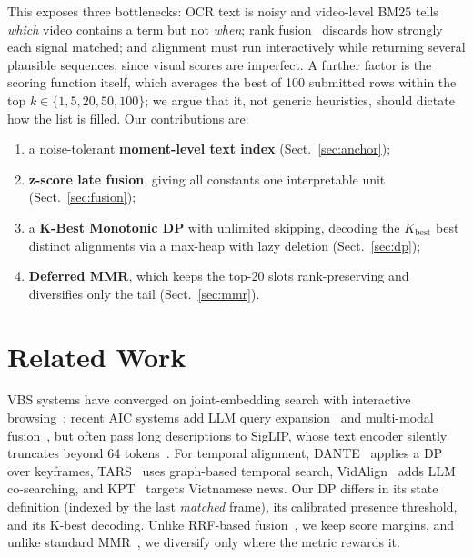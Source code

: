 \documentclass[runningheads]{llncs}
\newcommand{\Kb}{K_{\mathrm{best}}}
\begin{document}
This exposes three bottlenecks: OCR text is noisy and video-level BM25 tells \emph{which} video contains a term but not \emph{when}; rank fusion~\cite{cormack2009rrf,samuel2025mmmorrf} discards how strongly each signal matched; and alignment must run interactively while returning several plausible sequences, since visual scores are imperfect. A further factor is the scoring function itself, which averages the best of 100 submitted rows within the top $k\in\{1,5,20,50,100\}$; we argue that it, not generic heuristics, should dictate how the list is filled. Our contributions are:
\begin{enumerate}
\item a noise-tolerant \textbf{moment-level text index} (Sect.~\ref{sec:anchor});
\item \textbf{z-score late fusion}, giving all constants one interpretable unit (Sect.~\ref{sec:fusion});
\item a \textbf{K-Best Monotonic DP} with unlimited skipping, decoding the $\Kb$ best distinct alignments via a max-heap with lazy deletion (Sect.~\ref{sec:dp});
\item \textbf{Deferred MMR}, which keeps the top-20 slots rank-preserving and diversifies only the tail (Sect.~\ref{sec:mmr}).
\end{enumerate}

\section{Related Work}
VBS systems have converged on joint-embedding search with interactive browsing~\cite{vadicamo2024vbs,tran2025videoease}; recent AIC systems add LLM query expansion~\cite{vi2025heliosearch} and multi-modal fusion~\cite{nguyen2025vortex}, but often pass long descriptions to SigLIP, whose text encoder silently truncates beyond 64 tokens~\cite{zhai2023siglip}. For temporal alignment, DANTE~\cite{luu2025dante} applies a DP over keyframes, TARS~\cite{do2025tars} uses graph-based temporal search, VidAlign~\cite{nguyen2025vidalign} adds LLM co-searching, and KPT~\cite{vo2025kpt} targets Vietnamese news. Our DP differs in its state definition (indexed by the last \emph{matched} frame), its calibrated presence threshold, and its K-best decoding. Unlike RRF-based fusion~\cite{samuel2025mmmorrf}, we keep score margins, and unlike standard MMR~\cite{carbonell1998mmr}, we diversify only where the metric rewards it.
\end{document}
